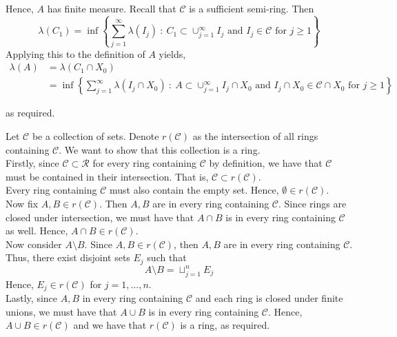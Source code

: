 \documentclass[12pt]{article}
\newenvironment{problem}[2][Problem]{\begin{trivlist}
\item[\hskip \labelsep {\bfseries #1}\hskip \labelsep {\bfseries #2.}]}{\end{trivlist}}
\begin{document}
Hence, $A$ has finite measure. Recall that $\mathcal{C}$ is a sufficient semi-ring. Then $$\lambda(C_1) = \inf \left\{ \sum_{j=1}^{\infty} \lambda(I_j) \ : \ C_1 \subset \cup_{j=1}^{\infty}I_j \text{ and } I_j \in \mathcal{C} \text{ for } j \geq 1 \right\}$$ Applying this to the definition of $A$ yields,
\begin{align*}
\lambda(A) &= \lambda(C_1 \cap X_0)\\
&= \inf \left\{ \sum_{j=1}^{\infty} \lambda(I_j \cap X_0) \ : \ A \subset \cup_{j=1}^{\infty} I_j \cap X_0 \text{ and } I_j \cap X_0 \in \mathcal{C} \cap X_0 \text{ for } j \geq 1 \right\}
\end{align*} 

as required.

\begin{problem}{6}
\end{problem}

Let $\mathcal{C}$ be a collection of sets. Denote $r(\mathcal{C})$ as the intersection of all rings containing $\mathcal{C}$. We want to show that this collection is a ring.\\

Firstly, since $\mathcal{C} \subset \mathcal{R}$ for every ring containing $\mathcal{C}$ by definition, we have that $\mathcal{C}$ must be contained in their intersection. That is, $\mathcal{C} \subset r(\mathcal{C})$.\\

Every ring containing $\mathcal{C}$ must also contain the empty set. Hence, $\emptyset \in r(\mathcal{C})$.\\

Now fix $A, B \in r(\mathcal{C})$. Then $A, B$ are in every ring containing $\mathcal{C}$. Since rings are closed under intersection, we must have that $A \cap B$ is in every ring containing $\mathcal{C}$ as well. Hence, $A \cap B \in r(\mathcal{C})$.\\

Now consider $A \setminus B$. Since $A, B \in r(\mathcal{C})$, then $A, B$ are in every ring containing $\mathcal{C}$. Thus, there exist disjoint sets $E_j$ such that $$A \setminus B = \sqcup_{j=1}^n E_j$$ Hence, $E_j \in r(\mathcal{C})$ for $j = 1, \ldots, n$.\\

Lastly, since $A, B$ in every ring containing $\mathcal{C}$ and each ring is closed under finite unions, we must have that $A \cup B$ is in every ring containing $\mathcal{C}$. Hence, $A \cup B \in r(\mathcal{C})$ and we have that $r(\mathcal{C})$ is a ring, as required.
\end{document}
